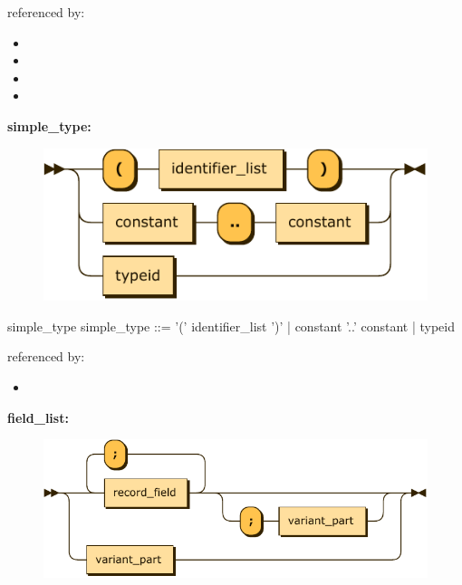 \documentclass[10pt,a4paper,twoside]{article}
\providecommand{\tightlist}{%
  \setlength{\itemsep}{0pt}\setlength{\parskip}{0pt}}
\newcounter{grammarbox}[section]
\begin{document}
referenced by:

\begin{itemize}
\tightlist
\item
\item
\item
\item
\end{itemize}

\textbf{simple\_type:}

\begin{figure}[H]
\centering
\includegraphics{diagram/simple_type.pdf}

\end{figure}

\begin{grammarbox}{simple\_type}
\vspace{0.5em}
simple\_type
         ::= '(' identifier\_list ')'
           | constant '..' constant
           | typeid
\end{grammarbox}

referenced by:

\begin{itemize}
\tightlist
\item
\end{itemize}

\textbf{field\_list:}

\begin{figure}[H]
\centering
\includegraphics{diagram/field_list.pdf}

\end{figure}
\end{document}
